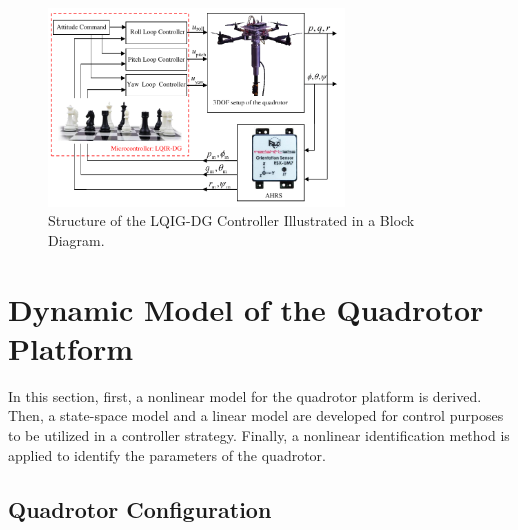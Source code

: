 \documentclass[3p,times]{elsarticle}
\begin{document}
\begin{figure}[H]
   \centering
   \includegraphics[width=0.7\textwidth]{../Figure/schematic.pdf}
   \caption{Structure of the LQIG-DG Controller Illustrated in a Block Diagram.}
   \label{fig:blockdiagram}
\end{figure}



\section{Dynamic Model of the Quadrotor Platform}\label{sec:modeling}
In this section, first, a nonlinear model for the quadrotor platform is derived. Then, a state-space model and a linear model are developed for control purposes to be utilized in a controller strategy. Finally, a nonlinear identification method is applied to identify the parameters of the quadrotor.
\subsection{Quadrotor Configuration}
\end{document}
